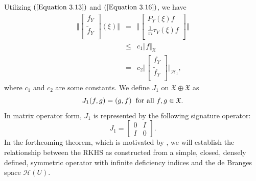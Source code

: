 \documentclass [12pt,reqno]{amsart}
\numberwithin{equation}{subsection}
\numberwithin{equation}{section}
\begin{document}
Utilizing $(\ref{Equation 3.13})$ and $(\ref{Equation 3.16})$, we have \begin{eqnarray}
\biggl\Vert \begin{bmatrix} 
	f_Y  \\
	\tilde{f}_Y\\
	\end{bmatrix} (\xi) \biggl\Vert &=& \biggl\Vert \begin{bmatrix} 
	P_{Y}(\xi)f  \\
	\frac{1}{\pi i} \tau_{Y}(\xi)f \\
	\end{bmatrix} \biggl\Vert \\
	&\leq & c_1 \Vert f \Vert_{\mathfrak{X}} \\ 
	&=& c_2 \biggl\Vert \begin{bmatrix} 
	f_Y  \\
	\tilde{f}_Y \\
	\end{bmatrix}  \biggl\Vert_{\mathcal{H}_1},
\end{eqnarray}
where $c_1$ and $c_2$ are some constants. We define $J_1$ on $\mathfrak{X} \oplus \mathfrak{X}$ as $$
J_1(f,g)=(g,f) \hspace{0.2cm} \text{for all}~ f,g \in \mathfrak{X}.
$$ In matrix operator form, $J_1$ is represented by the following signature operator: $$J_1 =\begin{bmatrix}
0 & I \\ 
I & 0
\end{bmatrix}  . $$
In the forthcoming theorem, which is motivated by \cite[Theorem 8.3]{alpay}, we will establish the relationship between the RKHS as constructed from a simple, closed, densely defined, symmetric operator with infinite deficiency indices and the de Branges space \(\mathcal{H}(U)\).
\end{document}
